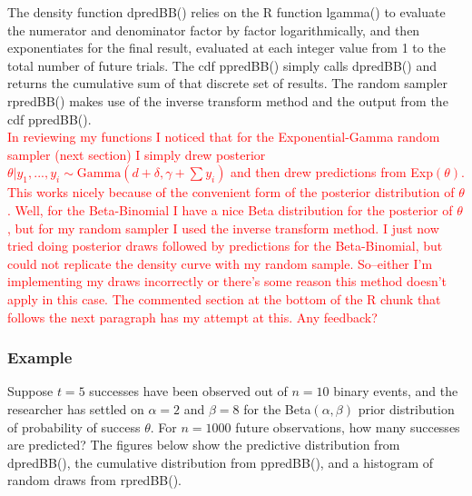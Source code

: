 \documentclass[12pt, a4paper]{article}
\begin{document}
The density function dpredBB() relies on the R function lgamma() to evaluate the numerator and denominator factor by factor logarithmically, and then exponentiates for the final result, evaluated at each integer value from 1 to the total number of future trials.  The cdf ppredBB() simply calls dpredBB() and returns the cumulative sum of that discrete set of results.  The random sampler rpredBB() makes use of the inverse transform method and the output from the cdf ppredBB().\\

\textcolor{red}{In reviewing my functions I noticed that for the Exponential-Gamma random sampler (next section) I simply drew posterior $\theta|y_1,...,y_i\sim\text{Gamma}(d+\delta,\gamma+\sum y_i)$ and then drew predictions from Exp$(\theta)$.  This works nicely because of the convenient form of the posterior distribution of $\theta$.  Well, for the Beta-Binomial I have a nice Beta distribution for the posterior of $\theta$, but for my random sampler I used the inverse transform method.  I just now tried doing posterior draws followed by predictions for the Beta-Binomial, but could not replicate the density curve with my random sample.  So--either I'm implementing my draws incorrectly or there's some reason this method doesn't apply in this case.  The commented section at the bottom of the R chunk that follows the next paragraph has my attempt at this.  Any feedback?}



    \subsubsection{Example}

Suppose $t=5$ successes have been observed out of $n=10$ binary events, and the researcher has settled on $\alpha = 2$ and $\beta = 8$ for the Beta$(\alpha,\beta)$ prior distribution of probability of success $\theta$.  For $n = 1000$ future observations, how many successes are predicted?  The figures below show the predictive distribution from dpredBB(), the cumulative distribution from ppredBB(), and a histogram of random draws from rpredBB().
\end{document}
